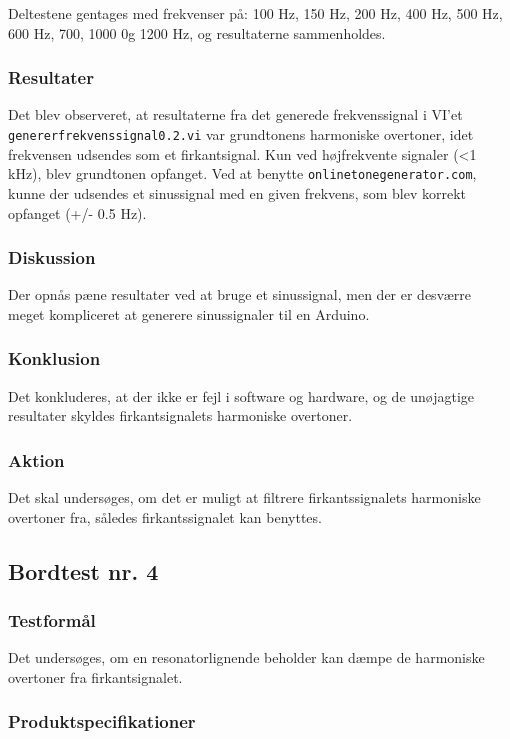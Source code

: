 {			Deltestene gentages med frekvenser på: 100 Hz, 150 Hz, 200 Hz, 400 Hz, 500 Hz, 600 Hz, 700, 1000 0g 1200 Hz, og resultaterne sammenholdes. 
			
			\subsubsection{Resultater}
			 Det blev observeret, at resultaterne fra det generede frekvenssignal i VI'et \texttt{genererfrekvenssignal0.2.vi} var grundtonens harmoniske overtoner, idet frekvensen udsendes som et firkantsignal. Kun ved højfrekvente signaler (<1 kHz), blev grundtonen opfanget. 
			 Ved at benytte \texttt{onlinetonegenerator.com}, kunne der udsendes et sinussignal med en given frekvens, som blev korrekt opfanget (+/- 0.5 Hz).     
			\subsubsection{Diskussion}
			Der opnås pæne resultater ved at bruge et sinussignal, men der er desværre meget kompliceret at generere sinussignaler til en Arduino.   
			\subsubsection{Konklusion}
			Det konkluderes, at der ikke er fejl i software og hardware, og de unøjagtige resultater skyldes firkantsignalets harmoniske overtoner.  
			\subsubsection{Aktion}
			Det skal undersøges, om det er muligt at filtrere firkantssignalets harmoniske overtoner fra, således firkantssignalet kan benyttes. 
		
		\subsection{Bordtest nr. 4} %
		\subsubsection{Testformål}
		Det undersøges, om en resonatorlignende beholder kan dæmpe de harmoniske overtoner fra firkantsignalet. 
		
		\subsubsection{Produktspecifikationer}
		
}
